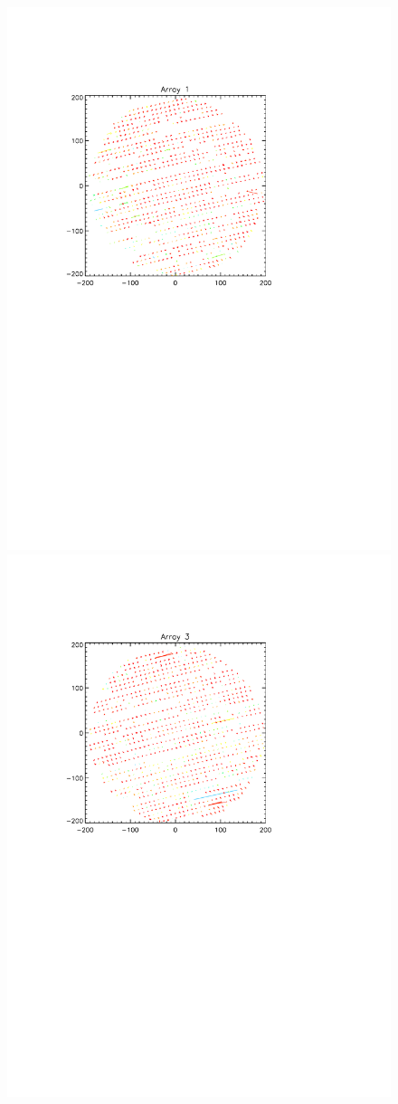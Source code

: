 \begin{figure}[htp]
\begin{center}
\includegraphics[trim=2cm 14cm 5cm 4cm, clip=true,width=0.6\linewidth]{Figures/A1_positions.pdf}
\includegraphics[trim=2cm 14cm 5cm 4cm, clip=true,width=0.6\linewidth]{Figures/A3_positions.pdf}

\end{center}
\end{figure}
